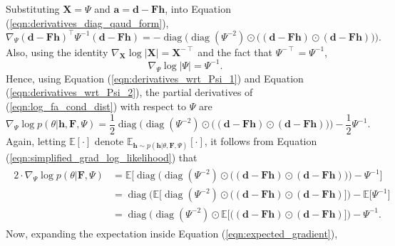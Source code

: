 \documentclass[msc,deptreport.inf]{infthesis} %
\newcommand{\matr}[1]{\mathbf{#1}}
\newcommand{\E}{\mathbb E}
\newcommand{\diag}{\mathop{\mathrm{diag}}}
\begin{document}
Substituting $\matr{X} = \Psi$ and $\matr{a} = \matr{d}- \matr{Fh}$, into Equation (\ref{eqn:derivatives_diag_qaud_form}),
\begin{equation}\label{eqn:derivatives_wrt_Psi_1}
	\nabla_\Psi (\matr{d} - \matr{Fh})^\intercal \Psi^{-1} (\matr{d}- \matr{Fh}) 
	= -\diag\Big(\diag(\Psi^{-2}) \odot \big((\matr{d} - \matr{Fh}) \odot (\matr{d} - \matr{Fh})\big)\Big).
\end{equation}
Also, using the identity $\nabla_\matr{X} \log |\matr{X}| = \matr{X}^{-\intercal}$ and the fact that $\Psi^{-\intercal} = \Psi^{-1}$, 
\begin{equation}\label{eqn:derivatives_wrt_Psi_2}
	\nabla_\Psi \log |\Psi|
	= \Psi^{-1}.
\end{equation}
Hence, using Equation (\ref{eqn:derivatives_wrt_Psi_1}) and Equation (\ref{eqn:derivatives_wrt_Psi_2}), the partial derivatives of (\ref{eqn:log_fa_cond_dist}) with respect to $\Psi$ are
\begin{equation}
	\nabla_{\Psi} \log p(\theta | \matr{h}, \matr{F}, \Psi)
	= \frac{1}{2} \diag\Big(\diag(\Psi^{-2}) \odot \big((\matr{d} - \matr{Fh}) \odot (\matr{d} - \matr{Fh})\big)\Big) - \frac{1}{2}\Psi^{-1}.
\end{equation}
Again, letting $\E[\cdot]$ denote $\E_{\matr{h} \sim p(\matr{h} | \theta, \matr{F}, \Psi)}[\cdot]$, it follows from Equation (\ref{eqn:simplified_grad_log_likelihood}) that
\begin{align}\label{eqn:expected_gradient}
\begin{split}
	2 \cdot \nabla_{\Psi} \log p(\theta | \matr{F}, \Psi) 
	& = \E \Big[ \diag\Big(\diag(\Psi^{-2}) \odot \big((\matr{d} - \matr{Fh}) \odot (\matr{d} - \matr{Fh})\big)\Big) - \Psi^{-1} \Big] \\
	& = \diag\Big(\E \big[\diag(\Psi^{-2}) \odot \big((\matr{d} - \matr{Fh}) \odot (\matr{d} - \matr{Fh})\big]\Big) - \E \big[ \Psi^{-1} \big] \\
	& = \diag\Big(\diag(\Psi^{-2}) \odot \E \big[\big((\matr{d} - \matr{Fh}) \odot (\matr{d} - \matr{Fh})\big]\Big) - \Psi^{-1}.
\end{split}
\end{align} 
Now, expanding the expectation inside Equation (\ref{eqn:expected_gradient}),
\end{document}
